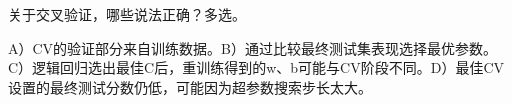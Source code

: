 关于交叉验证，哪些说法正确？多选。


A）CV的验证部分来自训练数据。B）通过比较最终测试集表现选择最优参数。C）逻辑回归选出最佳C后，重训练得到的w、b可能与CV阶段不同。D）最佳CV设置的最终测试分数仍低，可能因为超参数搜索步长太大。

